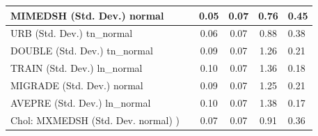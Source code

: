 \begin{table}
\begin{center}
\begin{tabular}{|l|l|c|c|c|l|}
			\hline
			MIMEDSH (Std. Dev.) normal &  & 0.05 & 0.07 & 0.76 & 0.45 \\
			\hline
			URB (Std. Dev.) tn_normal &  & 0.06 & 0.07 & 0.88 & 0.38 \\
			\hline
			DOUBLE (Std. Dev.) tn_normal &  & 0.09 & 0.07 & 1.26 & 0.21 \\
			\hline
			TRAIN (Std. Dev.) ln_normal &  & 0.10 & 0.07 & 1.36 & 0.18 \\
			\hline
			MIGRADE (Std. Dev.) normal &  & 0.09 & 0.07 & 1.25 & 0.21 \\
			\hline
			AVEPRE (Std. Dev.) ln_normal &  & 0.10 & 0.07 & 1.38 & 0.17 \\
			\hline
			 Chol: MXMEDSH (Std. Dev. normal) ) &  & 0.07 & 0.07 & 0.91 & 0.36 \\
			\hline
		\end{tabular}
	\end{center}
\end{table}
